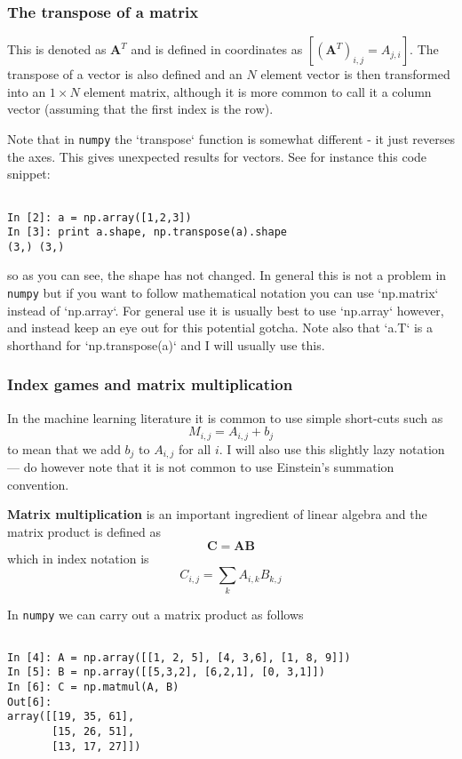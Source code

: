 \documentclass[a4paper,10pt]{article}
\begin{document}
\subsubsection{ The transpose of a matrix}

This is denoted as $\mathbf{A}^T$ and is defined in coordinates as
$ [ \left(\mathbf{A}^{T}\right)_{i, j} = {A}_{j, i} ] $. The transpose
of a vector is also defined and an $N$ element vector is then
transformed into an $1\times N$ element matrix, although it is more
common to call it a column vector (assuming that the first index is
the row).

Note that in \texttt{numpy} the `transpose` function is somewhat
different - it just reverses the axes. This gives unexpected results
for vectors. See for instance this code snippet:
\begin{lstlisting}

In [2]: a = np.array([1,2,3])
In [3]: print a.shape, np.transpose(a).shape
(3,) (3,)
\end{lstlisting}

so as you can see, the shape has not changed. In general this is not a
problem in \texttt{numpy} but if you want to follow mathematical
notation you can use `np.matrix` instead of `np.array`. For general
use it is usually best to use `np.array` however, and instead keep an
eye out for this potential gotcha.  Note also that `a.T` is a
shorthand for `np.transpose(a)` and I will usually use this.


\subsubsection{ Index games and matrix multiplication}

In the machine learning literature it is common to use simple short-cuts such as
$$M_{i,j} = A_{i,j} + b_{j}$$
to mean that we add $b_j$ to $A_{i,j}$ for all $i$. I will also use this slightly lazy notation --- do however note that it is not common to use Einstein's summation convention.

\textbf{Matrix multiplication} is an important ingredient of linear algebra and the matrix product is defined as
$$\mathbf{C} = \mathbf{A}\mathbf{B}$$
which in index notation is
$$C_{i,j} = \sum_k A_{i,k} B_{k, j}$$

In \texttt{numpy} we can carry out a matrix product as follows
\begin{lstlisting}

In [4]: A = np.array([[1, 2, 5], [4, 3,6], [1, 8, 9]])
In [5]: B = np.array([[5,3,2], [6,2,1], [0, 3,1]])
In [6]: C = np.matmul(A, B)
Out[6]: 
array([[19, 35, 61],
       [15, 26, 51],
       [13, 17, 27]])
\end{lstlisting}
\end{document}
